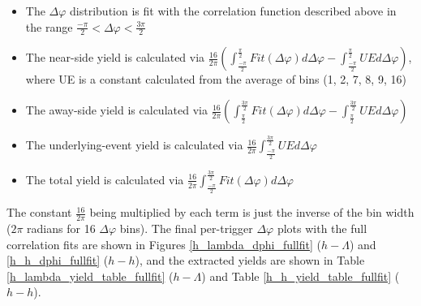 \documentclass[ALICE,manyauthors]{ALICE_analysis_notes}
\begin{document}
\begin{itemize}
\item The $\Delta\varphi$ distribution is fit with the correlation function described above in the range $\frac{-\pi}{2} < \Delta\varphi < \frac{3\pi}{2}$
\item The near-side yield is calculated via $\frac{16}{2\pi}(\int_{\frac{-\pi}{2}}^{\frac{\pi}{2}}Fit(\Delta\varphi)d\Delta\varphi - \int_{\frac{-\pi}{2}}^{\frac{\pi}{2}}UE d\Delta\varphi)$, where UE is a constant calculated from the average of bins (1, 2, 7, 8, 9, 16)
\item The away-side yield is calculated via $\frac{16}{2\pi}(\int_{\frac{\pi}{2}}^{\frac{3\pi}{2}}Fit(\Delta\varphi)d\Delta\varphi - \int_{\frac{\pi}{2}}^{\frac{3\pi}{2}}UE d\Delta\varphi)$
\item The underlying-event yield is calculated via $\frac{16}{2\pi}\int_{\frac{-\pi}{2}}^{\frac{3\pi}{2}}UE d\Delta\varphi$
\item The total yield is calculated via $\frac{16}{2\pi}\int_{\frac{-\pi}{2}}^{\frac{3\pi}{2}}Fit(\Delta\varphi) d\Delta\varphi$
\end{itemize}

The constant $\frac{16}{2\pi}$ being multiplied by each term is just the inverse of the bin width ($2\pi$ radians for 16 $\Delta\varphi$ bins).
The final per-trigger $\Delta\varphi$ plots with the full correlation fits are shown in Figures \ref{h_lambda_dphi_fullfit} ($h-\Lambda$) and \ref{h_h_dphi_fullfit} ($h-h$), and the extracted yields are shown in Table \ref{h_lambda_yield_table_fullfit} ($h-\Lambda$) and Table \ref{h_h_yield_table_fullfit} ($h-h$). 
\end{document}
